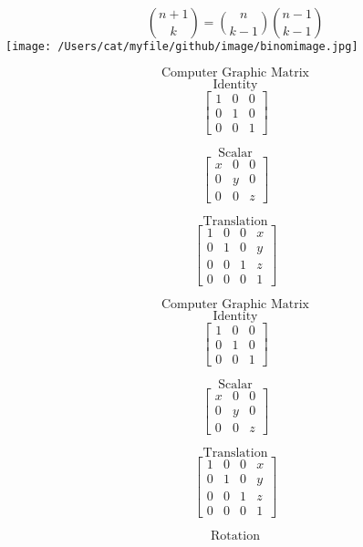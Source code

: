\documentclass{book}
\begin{document}
\newpage
\[  \binom{n+1}{k} = \binom{n}{k-1} \binom{n-1}{k-1} \] 
\texttt{[image: /Users/cat/myfile/github/image/binomimage.jpg]}

\newpage
\[\text{Computer Graphic Matrix} \]
\[\text{Identity}\]
\[
        \begin{bmatrix}
            1 & 0 & 0\\
            0 & 1 & 0\\   
            0 & 0 & 1  
        \end{bmatrix}
\]

\[ \text{Scalar} \]
\[
        \begin{bmatrix}
            x & 0 & 0\\
            0 & y & 0\\   
            0 & 0 & z  
        \end{bmatrix}
\]

\[ \text{Translation} \]
\[
        \begin{bmatrix}
            1 & 0 & 0 & x\\
            0 & 1 & 0 & y\\   
            0 & 0 & 1 & z\\  
            0 & 0 & 0 & 1  
        \end{bmatrix}
\]

\newpage
\[\text{Computer Graphic Matrix} \]
\[\text{Identity}\]
\[
        \begin{bmatrix}
            1 & 0 & 0\\
            0 & 1 & 0\\   
            0 & 0 & 1  
        \end{bmatrix}
\]

\[ \text{Scalar} \]
\[
        \begin{bmatrix}
            x & 0 & 0\\
            0 & y & 0\\   
            0 & 0 & z  
        \end{bmatrix}
\]

\[ \text{Translation} \]
\[
        \begin{bmatrix}
            1 & 0 & 0 & x\\
            0 & 1 & 0 & y\\   
            0 & 0 & 1 & z\\  
            0 & 0 & 0 & 1  
        \end{bmatrix}
\]

\[ \text{Rotation} \]
\end{document}
